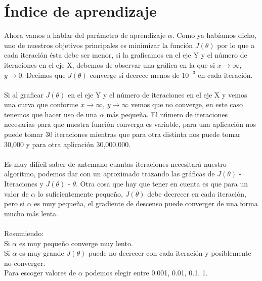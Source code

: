 \documentclass{report}
\begin{document}
\section{Índice de aprendizaje}
Ahora vamos a hablar del parámetro de aprendizaje $\alpha$. Como ya habíamos dicho, uno de nuestros objetivos principales es minimizar la función $J(\theta)$ por lo que a cada iteración ésta debe ser menor, si la graficamos en el eje Y y el número de iteraciones en el eje X, debemos de observar una gráfica en la que si $x\rightarrow\infty$, $y\rightarrow0$. Decimos que $J(\theta)$ converge si decrece menos de $10^{-3}$ en cada iteración.\\\\Si al graficar $J(\theta)$ en el eje Y y el número de iteraciones en el eje X y vemos una curva que conforme $x\rightarrow\infty$, $y\rightarrow\infty$ vemos que no converge, en este caso tenemos que hacer uso de una $\alpha$ más pequeña. El número de iteraciones necesarias para que nuestra función converga es variable, para una aplicación nos puede tomar 30 iteraciones mientras que para otra distinta nos puede tomar 30,000 y para otra aplicación 30,000,000.\\\\Es muy difícil saber de antemano cuantas iteraciones necesitará nuestro algoritmo, podemos dar con un aproximado trazando las gráficas de $J(\theta)$ - Iteraciones y $J(\theta)$ - $\theta$. Otra cosa que hay que tener en cuenta es que para un valor de $\alpha$ lo suficientemente pequeño, $J(\theta)$ debe decrecer en cada iteración, pero si $\alpha$ es muy pequeña, el gradiente de descenso puede converger de una forma mucho más lenta.\\\\Resumiendo:\\Si $\alpha$ es muy pequeño converge muy lento.\\Si $\alpha$ es muy grande $J(\theta)$ puede no decrecer con cada iteración y posiblemente no converger.\\Para escoger valores de $\alpha$ podemos elegir entre 0.001, 0.01, 0.1, 1.
\end{document}
